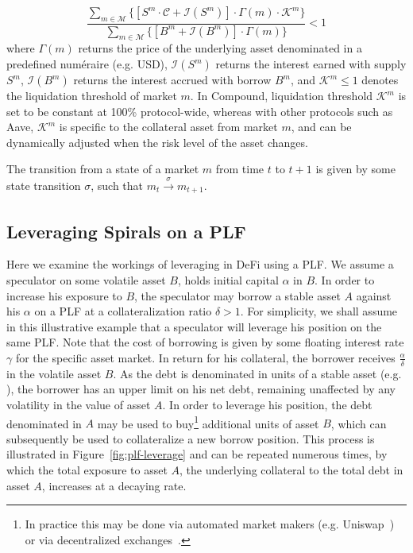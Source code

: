 \begin{equation}
    \frac{\sum_{m\in \mathcal{M}}
    \Big\{\left[S^{m} \cdot \mathcal{C} + \mathcal{I}(S^m)\right] \cdot \Gamma(m) \cdot \mathcal{K}^m \Big\}
    }{
    \sum_{m\in \mathcal{M}} \Big\{\left[B^m + \mathcal{I}(B^m)\right] \cdot \Gamma(m)\Big\}}
    < 1
    \label{eq:liqcond}
\end{equation}
where $\Gamma(m)$ returns the price of the underlying asset denominated in a predefined numéraire (e.g. USD), $\mathcal{I}(S^m)$ returns the interest earned with supply $S^m$, $\mathcal{I}(B^m)$ returns the interest accrued with borrow $B^m$, and $\mathcal{K}^m \leq 1$ denotes the liquidation threshold of market $m$. In Compound, liquidation threshold $\mathcal{K}^m$ is set to be constant at 100\% protocol-wide, whereas with other protocols such as Aave, $\mathcal{K}^m$ is specific to the collateral asset from market $m$, and can be dynamically adjusted when the risk level of the asset changes. 


The transition from a state of a market $m$ from time $t$ to $t+1$ is given by some state transition $\sigma$, such that $m_{t}\xrightarrow[]{\sigma}m_{t+1}$. 

\subsection{Leveraging Spirals on a PLF}
\label{ssec:leveraging-spirals-meth}
Here we examine the workings of leveraging in DeFi using a PLF. 
We assume a speculator on some volatile asset $B$, holds initial capital $\alpha$ in $B$.
In order to increase his exposure to $B$, the speculator may borrow a stable asset $A$ against his $\alpha$ on a PLF at a collateralization ratio $\delta>1$.
For simplicity, we shall assume in this illustrative example that a speculator will leverage his position on the same PLF.
Note that the cost of borrowing is given by some floating interest rate $\gamma$ for the specific asset market.
In return for his collateral, the borrower receives $\frac{\alpha}{\delta}$ in the volatile asset $B$.
As the debt is denominated in units of a stable asset (e.g. ), the borrower has an upper limit on his net debt, remaining unaffected by any volatility in the value of asset $A$.
In order to leverage his position, the debt denominated in $A$ may be used to buy\footnote{In practice this may be done via automated market makers \cite{xu2021dexAmm} (e.g. Uniswap~\cite{whitepaper:uniswap}) or via decentralized exchanges~\cite{web:dydx}.} additional units of asset $B$, which can subsequently be used to collateralize a new borrow position.
This process is illustrated in Figure~\ref{fig:plf-leverage} and can be repeated numerous times, by which the total exposure to asset $A$, the underlying collateral to the total debt in asset $A$, increases at a decaying rate.

